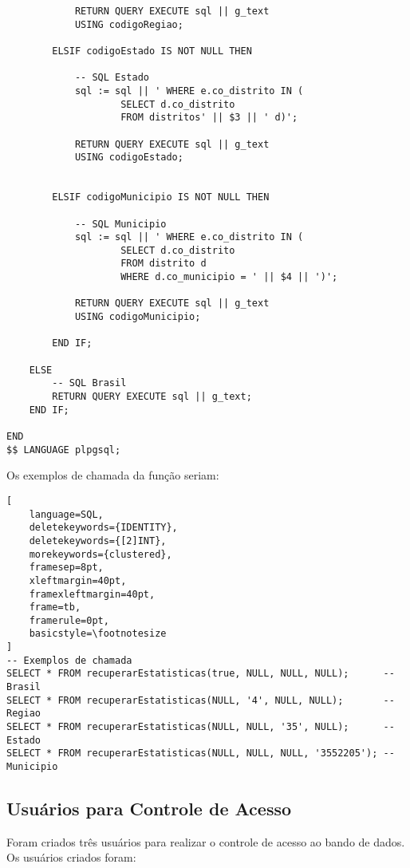 \documentclass[12pt,a4paper]{article}
\begin{document}
\begin{lstlisting}
            RETURN QUERY EXECUTE sql || g_text
            USING codigoRegiao;

        ELSIF codigoEstado IS NOT NULL THEN

            -- SQL Estado
            sql := sql || ' WHERE e.co_distrito IN (
                    SELECT d.co_distrito
                    FROM distritos' || $3 || ' d)';

            RETURN QUERY EXECUTE sql || g_text
            USING codigoEstado;


        ELSIF codigoMunicipio IS NOT NULL THEN

            -- SQL Municipio
            sql := sql || ' WHERE e.co_distrito IN (
                    SELECT d.co_distrito
                    FROM distrito d
                    WHERE d.co_municipio = ' || $4 || ')';

            RETURN QUERY EXECUTE sql || g_text
            USING codigoMunicipio;

        END IF;

    ELSE
        -- SQL Brasil
        RETURN QUERY EXECUTE sql || g_text;
    END IF;

END
$$ LANGUAGE plpgsql;
\end{lstlisting}

\vspace{0.5cm}

Os exemplos de chamada da função seriam:

\begin{lstlisting}[ 
    language=SQL,
    deletekeywords={IDENTITY},
    deletekeywords={[2]INT},
    morekeywords={clustered},
    framesep=8pt,
    xleftmargin=40pt,
    framexleftmargin=40pt,
    frame=tb,
    framerule=0pt,
    basicstyle=\footnotesize
]
-- Exemplos de chamada
SELECT * FROM recuperarEstatisticas(true, NULL, NULL, NULL);      -- Brasil
SELECT * FROM recuperarEstatisticas(NULL, '4', NULL, NULL);       -- Regiao
SELECT * FROM recuperarEstatisticas(NULL, NULL, '35', NULL);      -- Estado
SELECT * FROM recuperarEstatisticas(NULL, NULL, NULL, '3552205'); -- Municipio
\end{lstlisting}


\subsection{Usuários para Controle de Acesso}

Foram criados três usuários para realizar o controle de acesso ao bando de dados. Os usuários criados foram:
\end{document}
